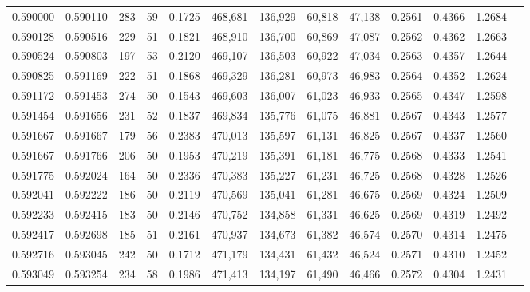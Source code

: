 \begin{tabular}{rrrrrrrrrrrrr}
0.590000 & 0.590110 &    283 &    59 &                                     0.1725 & 468,681 & 136,929 &  60,818 &  47,138 & 0.2561 & 0.4366 & 1.2684 \\
0.590128 & 0.590516 &    229 &    51 &                                     0.1821 & 468,910 & 136,700 &  60,869 &  47,087 & 0.2562 & 0.4362 & 1.2663 \\
0.590524 & 0.590803 &    197 &    53 &                                     0.2120 & 469,107 & 136,503 &  60,922 &  47,034 & 0.2563 & 0.4357 & 1.2644 \\
0.590825 & 0.591169 &    222 &    51 &                                     0.1868 & 469,329 & 136,281 &  60,973 &  46,983 & 0.2564 & 0.4352 & 1.2624 \\
0.591172 & 0.591453 &    274 &    50 &                                     0.1543 & 469,603 & 136,007 &  61,023 &  46,933 & 0.2565 & 0.4347 & 1.2598 \\
0.591454 & 0.591656 &    231 &    52 &                                     0.1837 & 469,834 & 135,776 &  61,075 &  46,881 & 0.2567 & 0.4343 & 1.2577 \\
0.591667 & 0.591667 &    179 &    56 &                                     0.2383 & 470,013 & 135,597 &  61,131 &  46,825 & 0.2567 & 0.4337 & 1.2560 \\
0.591667 & 0.591766 &    206 &    50 &                                     0.1953 & 470,219 & 135,391 &  61,181 &  46,775 & 0.2568 & 0.4333 & 1.2541 \\
0.591775 & 0.592024 &    164 &    50 &                                     0.2336 & 470,383 & 135,227 &  61,231 &  46,725 & 0.2568 & 0.4328 & 1.2526 \\
0.592041 & 0.592222 &    186 &    50 &                                     0.2119 & 470,569 & 135,041 &  61,281 &  46,675 & 0.2569 & 0.4324 & 1.2509 \\
0.592233 & 0.592415 &    183 &    50 &                                     0.2146 & 470,752 & 134,858 &  61,331 &  46,625 & 0.2569 & 0.4319 & 1.2492 \\
0.592417 & 0.592698 &    185 &    51 &                                     0.2161 & 470,937 & 134,673 &  61,382 &  46,574 & 0.2570 & 0.4314 & 1.2475 \\
0.592716 & 0.593045 &    242 &    50 &                                     0.1712 & 471,179 & 134,431 &  61,432 &  46,524 & 0.2571 & 0.4310 & 1.2452 \\
0.593049 & 0.593254 &    234 &    58 &                                     0.1986 & 471,413 & 134,197 &  61,490 &  46,466 & 0.2572 & 0.4304 & 1.2431 \\

\end{tabular}
